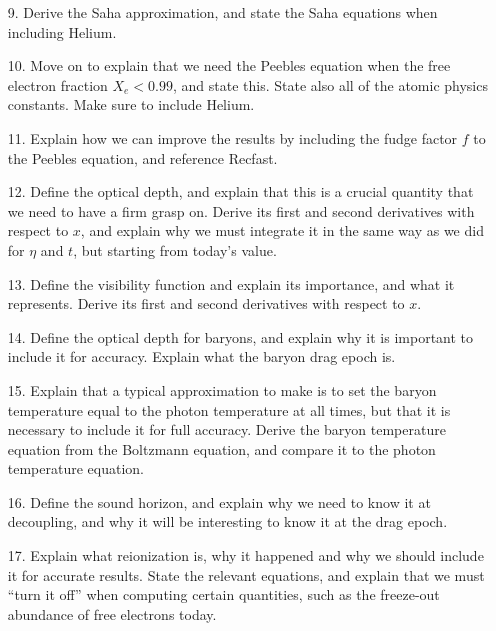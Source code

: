 \documentclass{aa}
\begin{document}
\begin{enumerate}
  \item [9.] Derive the Saha approximation, and state the Saha equations when including Helium.
  \item [10.] Move on to explain that we need the Peebles equation when the free electron fraction $X_e<0.99$, and state this. State also all of the atomic physics constants. Make sure to include Helium.
  \item [11.] Explain how we can improve the results by including the fudge factor $f$ to the Peebles equation, and reference Recfast.
  \item [12.] Define the optical depth, and explain that this is a crucial quantity that we need to have a firm grasp on. Derive its first and second derivatives with respect to $x$, and explain why we must integrate it in the same way as we did for $\eta$ and $t$, but starting from today's value.
  \item [13.] Define the visibility function and explain its importance, and what it represents. Derive its first and second derivatives with respect to $x$.
  \item [14.] Define the optical depth for baryons, and explain why it is important to include it for accuracy. Explain what the baryon drag epoch is.
  \item [15.] Explain that a typical approximation to make is to set the baryon temperature equal to the photon temperature at all times, but that it is necessary to include it for full accuracy. Derive the baryon temperature equation from the Boltzmann equation, and compare it to the photon temperature equation.
  \item [16.] Define the sound horizon, and explain why we need to know it at decoupling, and why it will be interesting to know it at the drag epoch.
  \item [17.] Explain what reionization is, why it happened and why we should include it for accurate results. State the relevant equations, and explain that we must ``turn it off'' when computing certain quantities, such as the freeze-out abundance of free electrons today.
\end{enumerate}


\end{document}
